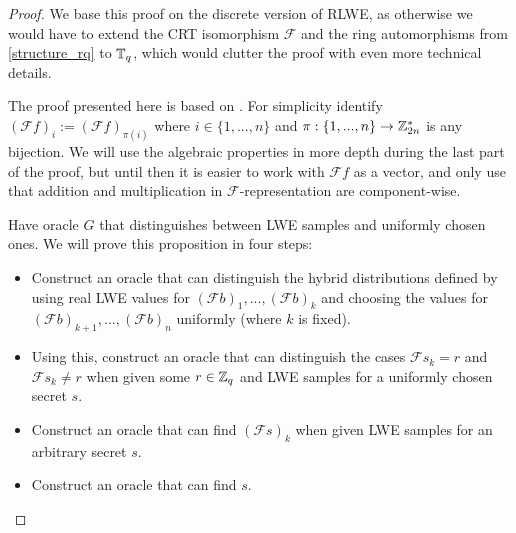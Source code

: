 \begin{proof}
We base this proof on the discrete version of RLWE, as otherwise we would have to extend the CRT isomorphism $\mathcal{F}$ and the ring automorphisms from \ref{structure_rq} to $\mathbb{T}_q$, which would clutter the proof with even more technical details.

The proof presented here is based on \cite{LyuPeiReg}. For simplicity identify $(\mathcal{F}f)_i := (\mathcal{F}f)_{\pi(i)}$ where $i \in \{1, ..., n\}$ and $\pi: \{1, ..., n\} \to \mathbb{Z}_{2n}^*$ is any bijection. We will use the algebraic properties in more depth during the last part of the proof, but until then it is easier to work with $\mathcal{F}f$ as a vector, and only use that addition and multiplication in $\mathcal{F}$-representation are component-wise.

Have oracle $G$ that distinguishes between LWE samples and uniformly 
chosen ones. We will prove this proposition in four steps:
\begin{itemize}
\item Construct an oracle that can distinguish the hybrid distributions defined by using real LWE values for $(\mathcal{F}b)_1, ..., (\mathcal{F}b)_k$ and choosing the values for $(\mathcal{F}b)_{k + 1}, ..., (\mathcal{F}b)_{n}$ uniformly (where $k$ is fixed).
\item Using this, construct an oracle that can distinguish the cases $\mathcal{F}s_k = r$ and $\mathcal{F}s_k \neq r$ when given some $r \in \mathbb{Z}_q$ and LWE samples for a uniformly chosen secret $s$.
\item Construct an oracle that can find $(\mathcal{F}s)_k$ when given LWE samples for an arbitrary secret $s$.
\item Construct an oracle that can find $s$.
\end{itemize}


\end{proof}
